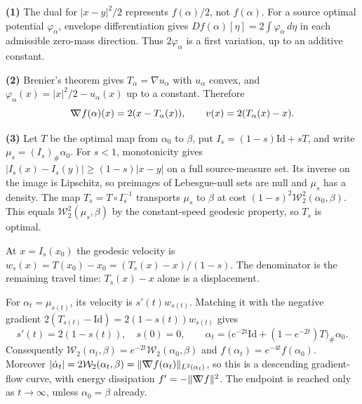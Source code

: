 \documentclass[11pt,a4paper]{article}
\theoremstyle{exostyle}
\newcommand{\Wtwo}{\mathcal{W}_2}
\newcommand{\gradW}{\mathord{\nabla\mkern-9.3mu\nabla}}
\begin{document}
\begin{solution}
\textbf{(1)} The dual for $|x-y|^2/2$ represents $f(\alpha)/2$, not
$f(\alpha)$. For a source optimal potential $\varphi_\alpha$, envelope
differentiation gives $Df(\alpha)[\eta]=2\int\varphi_\alpha\,d\eta$
in each admissible zero-mass direction. Thus $2\varphi_\alpha$ is a
first variation, up to an additive constant.

\textbf{(2)} Brenier's theorem gives $T_\alpha=\nabla u_\alpha$ with $u_\alpha$ convex, and $\varphi_\alpha(x)=|x|^2/2-u_\alpha(x)$ up to a constant. Therefore
\[
\gradW f(\alpha)(x)=2(x-T_\alpha(x)),\qquad v(x)=2(T_\alpha(x)-x).
\]

\textbf{(3)} Let $T$ be the optimal map from $\alpha_0$ to $\beta$, put
$I_s=(1-s)\mathrm{Id}+sT$, and write $\mu_s=(I_s)_\#\alpha_0$.
For $s<1$, monotonicity gives $|I_s(x)-I_s(y)|\ge(1-s)|x-y|$
on a full source-measure set. Its inverse on the image is Lipschitz,
so preimages of Lebesgue-null sets are null and $\mu_s$ has a density.
The map $T_s=T\circ I_s^{-1}$ transports $\mu_s$ to $\beta$ at cost
$(1-s)^2\Wtwo^2(\alpha_0,\beta)$. This equals $\Wtwo^2(\mu_s,\beta)$
by the constant-speed geodesic property, so $T_s$ is optimal.

At $x=I_s(x_0)$ the geodesic velocity is
$w_s(x)=T(x_0)-x_0=(T_s(x)-x)/(1-s)$. The denominator is the
remaining travel time: $T_s(x)-x$ alone is a displacement.

For $\alpha_t=\mu_{s(t)}$, its velocity is $s'(t)w_{s(t)}$. Matching it with the negative gradient $2(T_{s(t)}-\mathrm{Id})=2(1-s(t))w_{s(t)}$ gives
\[
s'(t)=2(1-s(t)),\quad s(0)=0,\qquad
\alpha_t=\bigl(e^{-2t}\mathrm{Id}+(1-e^{-2t})T\bigr)_\#\alpha_0.
\]
Consequently $\Wtwo(\alpha_t,\beta)=e^{-2t}\Wtwo(\alpha_0,\beta)$ and $f(\alpha_t)=e^{-4t}f(\alpha_0)$. Moreover $|\dot\alpha_t|=2\Wtwo(\alpha_t,\beta)=\|\gradW f(\alpha_t)\|_{L^2(\alpha_t)}$, so this is a descending gradient-flow curve, with energy dissipation $f'=-\|\gradW f\|^2$. The endpoint is reached only as $t\to\infty$, unless $\alpha_0=\beta$ already.
\end{solution}
\end{document}
